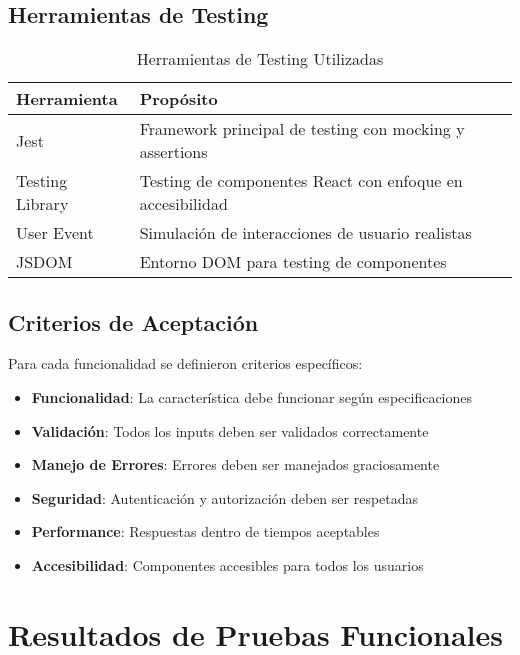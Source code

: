 \documentclass[12pt,a4paper]{article}
\begin{document}
\subsection{Herramientas de Testing}

\begin{table}[H]
\centering
\caption{Herramientas de Testing Utilizadas}
\begin{tabular}{@{}lp{8cm}@{}}
\toprule
\textbf{Herramienta} & \textbf{Propósito} \\
\midrule
Jest & Framework principal de testing con mocking y assertions \\
Testing Library & Testing de componentes React con enfoque en accesibilidad \\
User Event & Simulación de interacciones de usuario realistas \\
JSDOM & Entorno DOM para testing de componentes \\
\bottomrule
\end{tabular}
\end{table}

\subsection{Criterios de Aceptación}

Para cada funcionalidad se definieron criterios específicos:

\begin{itemize}
    \item \textbf{Funcionalidad}: La característica debe funcionar según especificaciones
    \item \textbf{Validación}: Todos los inputs deben ser validados correctamente
    \item \textbf{Manejo de Errores}: Errores deben ser manejados graciosamente
    \item \textbf{Seguridad}: Autenticación y autorización deben ser respetadas
    \item \textbf{Performance}: Respuestas dentro de tiempos aceptables
    \item \textbf{Accesibilidad}: Componentes accesibles para todos los usuarios
\end{itemize}

\section{Resultados de Pruebas Funcionales}
\end{document}

